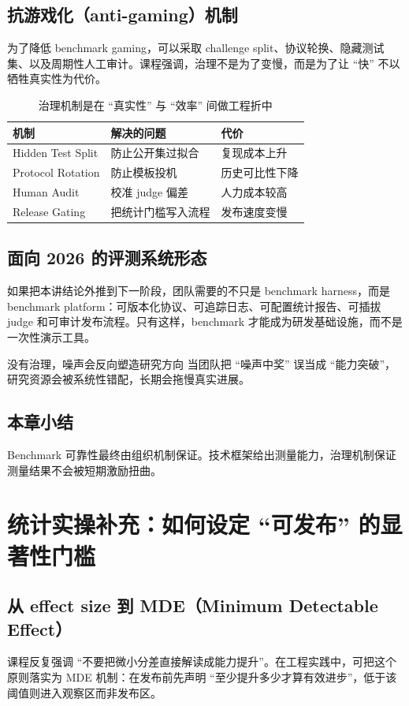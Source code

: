 \documentclass[a4paper]{article}
\begin{document}
\subsection{抗游戏化（anti-gaming）机制}
为了降低 benchmark gaming，可以采取 challenge split、协议轮换、隐藏测试集、以及周期性人工审计。课程强调，治理不是为了变慢，而是为了让 ``快'' 不以牺牲真实性为代价。

\begin{table}[H]
\centering
\begin{tabular}{p{3.1cm}p{3.8cm}p{3.8cm}}
\toprule
\textbf{机制} & \textbf{解决的问题} & \textbf{代价} \\
\midrule
Hidden Test Split & 防止公开集过拟合 & 复现成本上升 \\
Protocol Rotation & 防止模板投机 & 历史可比性下降 \\
Human Audit & 校准 judge 偏差 & 人力成本较高 \\
Release Gating & 把统计门槛写入流程 & 发布速度变慢 \\
\bottomrule
\end{tabular}
\caption{治理机制是在 ``真实性'' 与 ``效率'' 间做工程折中}
\end{table}

\subsection{面向 2026 的评测系统形态}
如果把本讲结论外推到下一阶段，团队需要的不只是 benchmark harness，而是 benchmark platform：可版本化协议、可追踪日志、可配置统计报告、可插拔 judge 和可审计发布流程。只有这样，benchmark 才能成为研发基础设施，而不是一次性演示工具。

\begin{warningbox}{没有治理，噪声会反向塑造研究方向}
当团队把 ``噪声中奖'' 误当成 ``能力突破''，研究资源会被系统性错配，长期会拖慢真实进展。
\end{warningbox}

\subsection{本章小结}
Benchmark 可靠性最终由组织机制保证。技术框架给出测量能力，治理机制保证测量结果不会被短期激励扭曲。

\section{统计实操补充：如何设定 ``可发布'' 的显著性门槛}

\subsection{从 effect size 到 MDE（Minimum Detectable Effect）}
课程反复强调 ``不要把微小分差直接解读成能力提升''。在工程实践中，可把这个原则落实为 MDE 机制：在发布前先声明 ``至少提升多少才算有效进步''，低于该阈值则进入观察区而非发布区。
\end{document}
